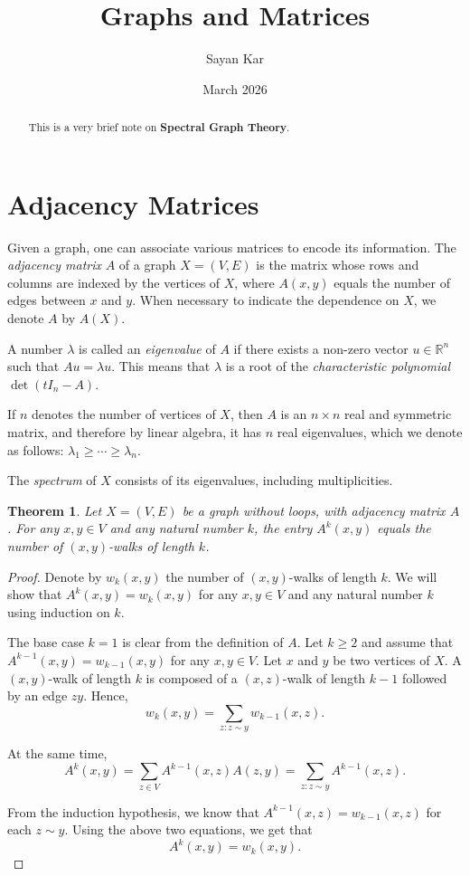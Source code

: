 \documentclass{amsart}
\title{Graphs and Matrices}
\author{Sayan Kar}
\date{March 2026}
\theoremstyle{plain}
\newtheorem{theorem}{Theorem}[section]
\begin{document}
\maketitle
\tableofcontents 

\begin{abstract}
    This is a very brief note on \textbf{Spectral Graph Theory}.
\end{abstract}

\section{Adjacency Matrices}

Given a graph, one can associate various matrices to encode its information. 
The \emph{adjacency matrix} $A$ of a graph $X = (V, E)$ is the matrix whose rows and columns 
are indexed by the vertices of $X$, where $A(x, y)$ equals the number of edges between 
$x$ and $y$. When necessary to indicate the dependence on $X$, we denote $A$ by $A(X)$.

A number $\lambda$ is called an \emph{eigenvalue} of $A$ if there exists a non-zero vector 
$u \in \mathbb{R}^n$ such that $ Au = \lambda u$. This means that $\lambda$ is a root of the \emph{characteristic polynomial} $\det(t I_n - A)$.

If $n$ denotes the number of vertices of $X$, then $A$ is an $n \times n$ real and 
symmetric matrix, and therefore by linear algebra, it has $n$ real eigenvalues, which we 
denote as follows: $\lambda_1 \ge \cdots \ge \lambda_n$.

The \emph{spectrum} of $X$ consists of its eigenvalues, including multiplicities.

\begin{theorem}
\label{clowalk}
Let $X = (V, E)$ be a graph without loops, with adjacency matrix $A$. 
For any $x, y \in V$ and any natural number $k$, the entry $A^k(x, y)$ 
equals the number of $(x, y)$-walks of length $k$.
\end{theorem}

\begin{proof}
Denote by $w_k(x, y)$ the number of $(x, y)$-walks of length $k$. 
We will show that $A^k(x, y) = w_k(x, y)$ for any $x, y \in V$ and any 
natural number $k$ using induction on $k$.

The base case $k = 1$ is clear from the definition of $A$. Let $k \ge 2$ and assume that $A^{k-1}(x, y) = w_{k-1}(x, y)$ for any 
$x, y \in V$. Let $x$ and $y$ be two vertices of $X$. A $(x, y)$-walk 
of length $k$ is composed of a $(x, z)$-walk of length $k-1$ followed 
by an edge $zy$. Hence,
\[
w_k(x, y) = \sum_{z : z \sim y} w_{k-1}(x, z).
\]

At the same time,
\[
A^k(x, y) = \sum_{z \in V} A^{k-1}(x, z) A(z, y) 
= \sum_{z : z \sim y} A^{k-1}(x, z).
\]

From the induction hypothesis, we know that 
$A^{k-1}(x, z) = w_{k-1}(x, z)$ for each $z \sim y$. 
Using the above two equations, we get that 
\[
A^k(x, y) = w_k(x, y).
\]
\end{proof}
\end{document}
